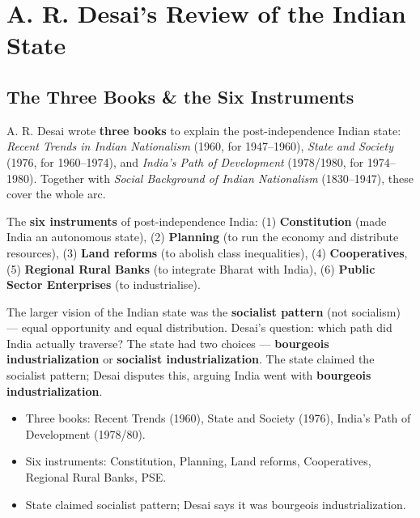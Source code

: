 \chapter{A. R. Desai's Review of the Indian State}

\section{The Three Books \& the Six Instruments}

A. R. Desai wrote \textbf{three books} to explain the post-independence Indian state: \emph{Recent Trends in Indian Nationalism} (1960, for 1947--1960), \emph{State and Society} (1976, for 1960--1974), and \emph{India's Path of Development} (1978/1980, for 1974--1980). Together with \emph{Social Background of Indian Nationalism} (1830--1947), these cover the whole arc.

\begin{KeyConcept}
The \textbf{six instruments} of post-independence India: (1) \textbf{Constitution} (made India an autonomous state), (2) \textbf{Planning} (to run the economy and distribute resources), (3) \textbf{Land reforms} (to abolish class inequalities), (4) \textbf{Cooperatives}, (5) \textbf{Regional Rural Banks} (to integrate Bharat with India), (6) \textbf{Public Sector Enterprises} (to industrialise).
\end{KeyConcept}

The larger vision of the Indian state was the \textbf{socialist pattern} (not socialism) --- equal opportunity and equal distribution. Desai's question: which path did India actually traverse? The state had two choices --- \textbf{bourgeois industrialization} or \textbf{socialist industrialization}. The state claimed the socialist pattern; Desai disputes this, arguing India went with \textbf{bourgeois industrialization}.

\begin{QuickRevision}
\begin{itemize}
\item Three books: Recent Trends (1960), State and Society (1976), India's Path of Development (1978/80).
\item Six instruments: Constitution, Planning, Land reforms, Cooperatives, Regional Rural Banks, PSE.
\item State claimed socialist pattern; Desai says it was bourgeois industrialization.
\end{itemize}
\end{QuickRevision}

